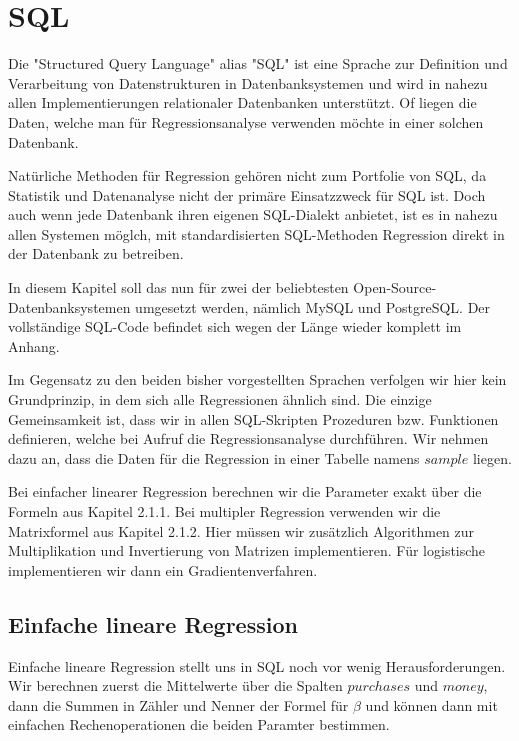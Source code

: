 \section{SQL}

Die "Structured Query Language" alias "SQL" ist eine Sprache zur Definition und Verarbeitung von Datenstrukturen in Datenbanksystemen und wird in nahezu allen Implementierungen relationaler Datenbanken unterstützt. Of liegen die Daten, welche man für Regressionsanalyse verwenden möchte in einer solchen Datenbank.

Natürliche Methoden für Regression gehören nicht zum Portfolie von SQL, da Statistik und Datenanalyse nicht der primäre Einsatzzweck für SQL ist. Doch auch wenn jede Datenbank ihren eigenen SQL-Dialekt anbietet, ist es in nahezu allen Systemen möglch, mit standardisierten SQL-Methoden Regression direkt in der Datenbank zu betreiben.

In diesem Kapitel soll das nun für zwei der beliebtesten Open-Source-Datenbanksystemen umgesetzt werden, nämlich MySQL und PostgreSQL. Der vollständige SQL-Code befindet sich wegen der Länge wieder komplett im Anhang.

Im Gegensatz zu den beiden bisher vorgestellten Sprachen verfolgen wir hier kein Grundprinzip, in dem sich alle Regressionen ähnlich sind. Die einzige Gemeinsamkeit ist, dass wir in allen SQL-Skripten Prozeduren bzw. Funktionen definieren, welche bei Aufruf die Regressionsanalyse durchführen. Wir nehmen dazu an, dass die Daten für die Regression in einer Tabelle namens $sample$ liegen.

Bei einfacher linearer Regression berechnen wir die Parameter exakt über die Formeln aus Kapitel 2.1.1. Bei multipler Regression verwenden wir die Matrixformel aus Kapitel 2.1.2. Hier müssen wir zusätzlich Algorithmen zur Multiplikation und Invertierung von Matrizen implementieren. Für logistische implementieren wir dann ein Gradientenverfahren.

\subsection{Einfache lineare Regression}

Einfache lineare Regression stellt uns in SQL noch vor wenig Herausforderungen. Wir berechnen zuerst die Mittelwerte über die Spalten $purchases$ und $money$, dann die Summen in Zähler und Nenner der Formel für $\beta$ und können dann mit einfachen Rechenoperationen die beiden Paramter bestimmen.

